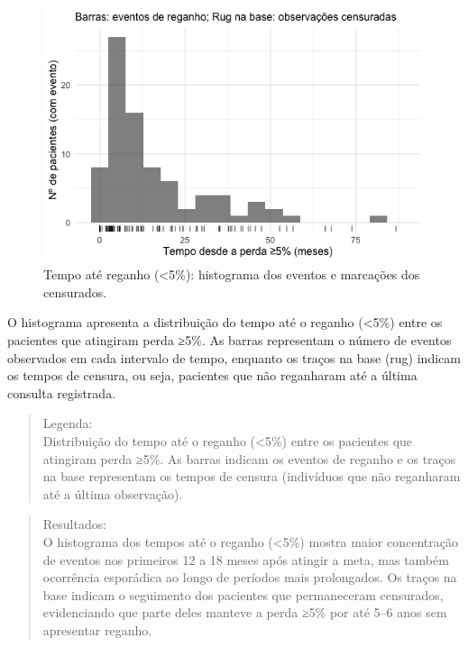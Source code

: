 \documentclass[
]{article}
\begin{document}
\begin{figure}[H]

{\centering \includegraphics[width=1\textwidth,height=\textheight]{outputs/figs/dist-tempo-ate-reganho-hist-1.png}

}

\caption{Tempo até reganho (\textless5\%): histograma dos eventos e
marcações dos censurados.}

\end{figure}%

O histograma apresenta a distribuição do tempo até o reganho
(\textless5\%) entre os pacientes que atingiram perda ≥5\%. As barras
representam o número de eventos observados em cada intervalo de tempo,
enquanto os traços na base (rug) indicam os tempos de censura, ou seja,
pacientes que não reganharam até a última consulta registrada.

\begin{quote}
Legenda:\\
Distribuição do tempo até o reganho (\textless5\%) entre os pacientes
que atingiram perda ≥5\%. As barras indicam os eventos de reganho e os
traços na base representam os tempos de censura (indivíduos que não
reganharam até a última observação).
\end{quote}

\begin{quote}
Resultados:\\
O histograma dos tempos até o reganho (\textless5\%) mostra maior
concentração de eventos nos primeiros 12 a 18 meses após atingir a meta,
mas também ocorrência esporádica ao longo de períodos mais prolongados.
Os traços na base indicam o seguimento dos pacientes que permaneceram
censurados, evidenciando que parte deles manteve a perda ≥5\% por até
5--6 anos sem apresentar reganho.
\end{quote}
\end{document}
